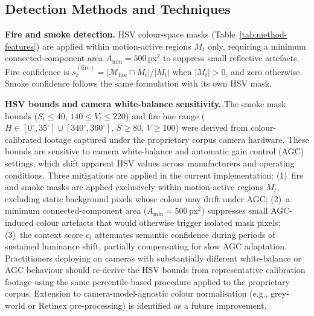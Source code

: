 \documentclass[a4paper,fleqn]{cas-dc}
\begin{document}
\FloatBarrier
\subsection{Detection Methods and Techniques}
 
\textbf{Fire and smoke detection.} HSV colour-space masks (Table~\ref{tab:method-features}) are applied within motion-active regions $M_t$ only, requiring a minimum connected-component area $A_{\min} = 500$\,px$^2$ to suppress small reflective artefacts. Fire confidence is $s_t^{(\text{fire})} = |\mathcal{M}_{\text{fire}} \cap M_t| / |M_t|$ when $|M_t| > 0$, and zero otherwise. Smoke confidence follows the same formulation with its own HSV mask.
 
\textbf{HSV bounds and camera white-balance sensitivity.}
The smoke mask bounds ($S_t \le 40$, $140 \le V_t \le 220$) and fire hue range ($H \in [0^\circ,35^\circ]\cup[340^\circ,360^\circ]$, $S \ge 80$, $V \ge 100$) were derived from colour-calibrated footage captured under the proprietary corpus camera hardware. These bounds are sensitive to camera white-balance and automatic gain control (AGC) settings, which shift apparent HSV values across manufacturers and operating conditions. Three mitigations are applied in the current implementation: (1)~fire and smoke masks are applied exclusively within motion-active regions $M_t$, excluding static background pixels whose colour may drift under AGC; (2)~a minimum connected-component area ($A_{\min} = 500$\,px$^2$) suppresses small AGC-induced colour artefacts that would otherwise trigger isolated mask pixels; (3)~the context score $c_t$ attenuates semantic confidence during periods of sustained luminance shift, partially compensating for slow AGC adaptation. Practitioners deploying on cameras with substantially different white-balance or AGC behaviour should re-derive the HSV bounds from representative calibration footage using the same percentile-based procedure applied to the proprietary corpus. Extension to camera-model-agnostic colour normalisation (e.g., grey-world or Retinex pre-processing) is identified as a future improvement.
 
\end{document}
